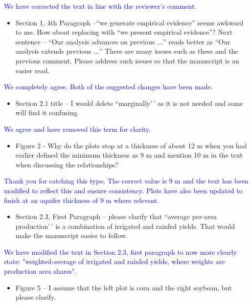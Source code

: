 \documentclass[
]{article}
\providecommand{\tightlist}{%
  \setlength{\itemsep}{0pt}\setlength{\parskip}{0pt}}
\begin{document}
\textcolor{blue}{We have corrected the text in line with the reviewer's comment.}

\begin{itemize}
\tightlist
\item
  Section 1, 4th Paragraph --``we generate empirical evidence'' seems awkward to me. How about replacing with ``we present empirical evidence''? Next sentence – ``Our analysis advances on previous $\dots$'' reads better as ``Our analysis extends previous $\dots$'' There are many issues such as these and the previous comment. Please address such issues so that the manuscript is an easier read.
\end{itemize}

\textcolor{blue}{We completely agree. Both of the suggested changes have been made.}

\begin{itemize}
\tightlist
\item
  Section 2.1 title -- I would delete ``marginally'\,' as it is not
  needed and some will find it confusing.
\end{itemize}

\textcolor{blue}{We agree and have removed this term for clarity.}

\begin{itemize}
\tightlist
\item
  Figure 2 - Why do the plots stop at a thickness of about 12 m when you
  had earlier defined the minimum thickness as 9 m and mention 10 m in
  the text when discussing the relationships?
\end{itemize}

\textcolor{blue}{Thank you for catching this typo. The correct value is 9 m and the text has been modified to reflect this and ensure consistency. Plots have also been updated to finish at an aquifer thickness of 9 m where relevant.}

\begin{itemize}
\tightlist
\item
  Section 2.3, First Paragraph -- please clarify that ``average per-area
  production'\,' is a combination of irrigated and rainfed yields. That
  would make the manuscript easier to follow.
\end{itemize}

\textcolor{blue}{We have modified the text in Section 2.3, first paragraph to now more clearly state: "weighted-average of irrigated and rainfed yields, where weights are production area shares".}

\begin{itemize}
\tightlist
\item
  Figure 5 -- I assume that the left plot is corn and the right soybean,
  but please clarify.
\end{itemize}
\end{document}

